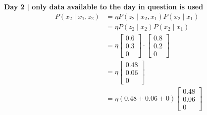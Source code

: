 \documentclass[answers]{exam}
\begin{document}
\begin{questions}
\begin{parts}
        \begin{solution}
            \textbf{Day 2 $\mid$ only data available to the day in question is used}
            \begin{align*}
                P(x_2 \mid x_1, z_2) & = \eta P(z_2 \mid x_2, x_1) P(x_2 \mid x_1)          \\
                                     & = \eta P(z_2 \mid x_2) P(x_2 \mid x_1)               \\
                                     & = \eta \begin{bmatrix}
                                                  0.6 \\
                                                  0.3 \\
                                                  0
                                              \end{bmatrix} \cdot \begin{bmatrix}
                                                                      0.8 \\
                                                                      0.2 \\
                                                                      0
                                                                  \end{bmatrix}            \\
                                     & = \eta \begin{bmatrix}
                                                  0.48 \\
                                                  0.06 \\
                                                  0
                                              \end{bmatrix}                                \\
                                     & = \eta \left( 0.48 + 0.06 + 0 \right) \begin{bmatrix}
                                                                                 0.48 \\
                                                                                 0.06 \\
                                                                                 0
                                                                             \end{bmatrix} \\

\end{align*}
\end{solution}
\end{parts}
\end{questions}
\end{document}
